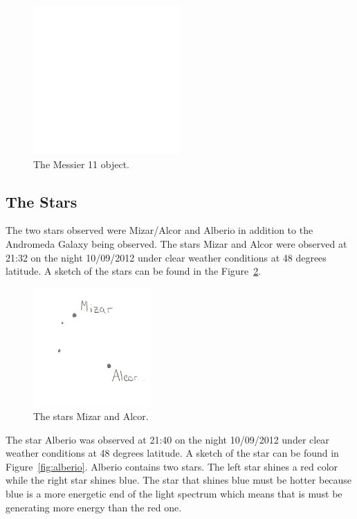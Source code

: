 \documentclass{article}
\begin{document}
\begin{figure}[h]
\centering
\includegraphics[width=0.5\textwidth]{images/blank}
\caption{The Messier 11 object.\label{fig:m11}}
\end{figure}

\subsection{The Stars}

The two stars observed were Mizar/Alcor and Alberio in addition to the Andromeda Galaxy being observed. The stars Mizar and Alcor
were observed at 21:32 on the night 10/09/2012 under clear weather conditions at 48 degrees latitude. A sketch of the stars can be 
found in the Figure~\ref{fig:mizar}.

\begin{figure}[h!]
\centering
\includegraphics[width=0.4\textwidth]{images/Mizar}
\caption{The stars Mizar and Alcor.\label{fig:mizar}}
\end{figure}

The star Alberio was observed at 21:40 on the night 10/09/2012 under clear weather conditions at 48 degrees latitude. A sketch of the 
star can be found in Figure~\ref{fig:alberio}. Alberio contains two stars. The left star shines a red color while the right star shines blue.
The star that shines blue must be hotter because blue is a more energetic end of the light spectrum which means that is must be
generating more energy than the red one.
\end{document}
